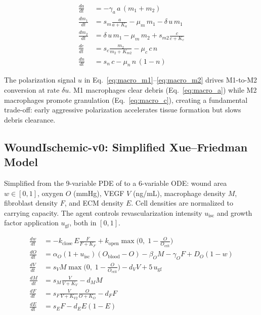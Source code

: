 \documentclass[11pt,a4paper]{article}
\begin{document}
\begin{align}
\frac{da}{dt} &= -\gamma_a \, a \, (m_1 + m_2) \label{eq:macro_a} \\
\frac{dm_1}{dt} &= s_m \frac{a}{a + K_a} - \mu_m \, m_1 - \delta \, u \, m_1 \label{eq:macro_m1} \\
\frac{dm_2}{dt} &= \delta \, u \, m_1 - \mu_m \, m_2 + s_{m2} \frac{c}{c + K_c} \label{eq:macro_m2} \\
\frac{dc}{dt} &= s_c \frac{m_2}{m_2 + K_{m2}} - \mu_c \, c \, n \label{eq:macro_c} \\
\frac{dn}{dt} &= s_n \, c - \mu_n \, n \, (1 - n) \label{eq:macro_n}
\end{align}

The polarization signal $u$ in Eq.~\eqref{eq:macro_m1}--\eqref{eq:macro_m2} drives M1-to-M2 conversion at rate $\delta u$. M1 macrophages clear debris (Eq.~\ref{eq:macro_a}) while M2 macrophages promote granulation (Eq.~\ref{eq:macro_c}), creating a fundamental trade-off: early aggressive polarization accelerates tissue formation but slows debris clearance.

\subsection{WoundIschemic-v0: Simplified Xue--Friedman Model}

Simplified from the 9-variable PDE of \citet{xue2009} to a 6-variable ODE: wound area $w \in [0,1]$, oxygen $O$ (mmHg), VEGF $V$ (ng/mL), macrophage density $M$, fibroblast density $F$, and ECM density $E$. Cell densities are normalized to carrying capacity. The agent controls revascularization intensity $u_{\text{isc}}$ and growth factor application $u_{\text{gf}}$, both in $[0, 1]$.

\begin{align}
\frac{dw}{dt} &= -k_{\text{close}} \, E \frac{F}{F + K_F} + k_{\text{open}} \max\!\Big(0,\; 1 - \frac{O}{O_{\text{crit}}}\Big) \label{eq:isch_w} \\
\frac{dO}{dt} &= \alpha_O (1 + u_{\text{isc}})(O_{\text{blood}} - O) - \beta_O M - \gamma_O F + D_O (1 - w) \label{eq:isch_O} \\
\frac{dV}{dt} &= s_V M \max\!\Big(0,\; 1 - \frac{O}{O_{\text{crit}}}\Big) - d_V V + 5\, u_{\text{gf}} \label{eq:isch_V} \\
\frac{dM}{dt} &= s_M \frac{V}{V + K_V} - d_M M \label{eq:isch_M} \\
\frac{dF}{dt} &= s_F \frac{V}{V + K_{V2}} \frac{O}{O + K_O} - d_F F \label{eq:isch_F} \\
\frac{dE}{dt} &= s_E F - d_E E(1 - E) \label{eq:isch_E}
\end{align}
\end{document}
